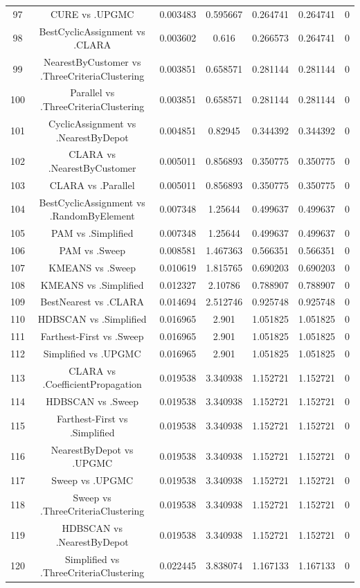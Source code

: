 \documentclass[a4paper,10pt]{article}
\begin{document}
\begin{landscape}
\begin{table}[!htp]
\begin{tabular}{ccccccc}
97&CURE vs .UPGMC&0.003483&0.595667&0.264741&0.264741&0\\
98&BestCyclicAssignment vs .CLARA&0.003602&0.616&0.266573&0.264741&0\\
99&NearestByCustomer vs .ThreeCriteriaClustering&0.003851&0.658571&0.281144&0.281144&0\\
100&Parallel vs .ThreeCriteriaClustering&0.003851&0.658571&0.281144&0.281144&0\\
101&CyclicAssignment vs .NearestByDepot&0.004851&0.82945&0.344392&0.344392&0\\
102&CLARA vs .NearestByCustomer&0.005011&0.856893&0.350775&0.350775&0\\
103&CLARA vs .Parallel&0.005011&0.856893&0.350775&0.350775&0\\
104&BestCyclicAssignment vs .RandomByElement&0.007348&1.25644&0.499637&0.499637&0\\
105&PAM vs .Simplified&0.007348&1.25644&0.499637&0.499637&0\\
106&PAM vs .Sweep&0.008581&1.467363&0.566351&0.566351&0\\
107&KMEANS vs .Sweep&0.010619&1.815765&0.690203&0.690203&0\\
108&KMEANS vs .Simplified&0.012327&2.10786&0.788907&0.788907&0\\
109&BestNearest vs .CLARA&0.014694&2.512746&0.925748&0.925748&0\\
110&HDBSCAN vs .Simplified&0.016965&2.901&1.051825&1.051825&0\\
111&Farthest-First vs .Sweep&0.016965&2.901&1.051825&1.051825&0\\
112&Simplified vs .UPGMC&0.016965&2.901&1.051825&1.051825&0\\
113&CLARA vs .CoefficientPropagation&0.019538&3.340938&1.152721&1.152721&0\\
114&HDBSCAN vs .Sweep&0.019538&3.340938&1.152721&1.152721&0\\
115&Farthest-First vs .Simplified&0.019538&3.340938&1.152721&1.152721&0\\
116&NearestByDepot vs .UPGMC&0.019538&3.340938&1.152721&1.152721&0\\
117&Sweep vs .UPGMC&0.019538&3.340938&1.152721&1.152721&0\\
118&Sweep vs .ThreeCriteriaClustering&0.019538&3.340938&1.152721&1.152721&0\\
119&HDBSCAN vs .NearestByDepot&0.019538&3.340938&1.152721&1.152721&0\\
120&Simplified vs .ThreeCriteriaClustering&0.022445&3.838074&1.167133&1.167133&0\\

\end{tabular}
\end{table}
\end{landscape}
\end{document}
